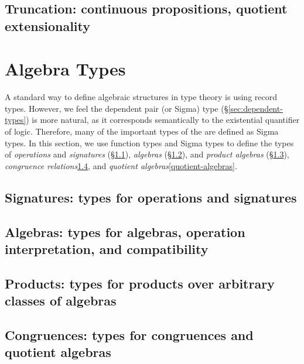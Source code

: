 \documentclass[a4paper,UKenglish,cleveref,autoref,thm-restate,12pt]{../lipics-v2021-wjd}
\begin{document}
\subsection{Truncation: continuous propositions, quotient extensionality}\label{sec:trunc-sets-prop}


\section{Algebra Types}\label{sec:algebra-types}
A standard way to define algebraic structures in type theory is using record types.  However, we feel the dependent pair (or Sigma) type (\S\ref{sec:dependent-types}) is more natural, as it corresponds semantically to the existential quantifier of logic. Therefore, many of the important types of the \ualib are defined as Sigma types. In this section, we use function types and Sigma types to define the types of \emph{operations} and \emph{signatures} (\S\ref{sec:oper-sign}), \emph{algebras} (\S\ref{sec:algebras}), and \emph{product algebras} (\S\ref{sec:product-algebras}), \emph{congruence relations}\ref{congruences}, and \emph{quotient algebras}\ref{quotient-algebras}.

\subsection{Signatures: types for operations and signatures}\label{sec:oper-sign}


\subsection{Algebras: types for algebras, operation interpretation, and compatibility}\label{sec:algebras}


\subsection{Products: types for products over arbitrary classes of algebras}\label{sec:product-algebras}


\subsection{Congruences: types for congruences and quotient algebras}\label{congruences}

\end{document}
